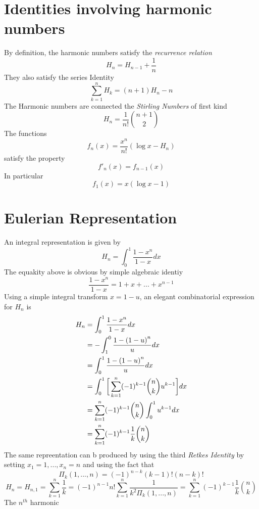 \documentclass{article}
\begin{document}
\section{Identities involving harmonic numbers}
By definition, the harmonic numbers satisfy the \emph{recurrence relation}
\begin{equation} 
H_{n}=H_{n-1}+\frac{1}{n} \label{recurrence relation}
\end{equation}
They also satisfy the series Identity
\begin{equation}
\sum_{k=1}^n H_{k} = (n+1) H_{n} - n \label{Series Identity}
\end{equation}
The Harmonic numbers are connected the \emph{Stirling Numbers} of first kind
\begin{equation}
H_{n} = \frac{1}{n!} {n+1 \choose 2} \label{Stirling Identity}
\end{equation}
The functions
\begin{equation}
f_{n} (x) = \frac{x^n}{n!} (\log{x}-H_{n})
\end{equation}
satisfy the property
\begin{equation}
{f'}_{n} (x) = f_{n-1} (x)
\end{equation}
In particular
\begin{equation}
f_{1} (x) = x(\log{x}-1)       			
\end{equation}
\section{Eulerian Representation}
An integral representation is given by
\begin{equation}
H_{n} = \int_{0}^{1} \frac{1-x^n}{1-x} dx \label{Euler equation}
\end{equation}
The equakity above is obvious by simple algebraic identiy
\begin{equation}
\frac{1-x^n}{1-x} = 1+x+...+x^{n-1}
\end{equation}
Using a simple integral transform ${x = 1-u}$, an elegant combinatorial expression for $H_{n}$ is
\begin{align}
H_{n} &= \int_{0}^{1} \frac{1-x^n}{1-x} dx \\
	 &= -\int_{1}^{0} \frac{1-{(1-u)}^n}{u} dx \\
	 &= \int_{0}^{1} \frac{1-{(1-u)}^n}{u} dx \\
	 &= \int_{0}^{1} \bigg{[}\sum_{k=1}^{n} (-1)^{k-1} {n \choose k} u^{k-1}\bigg{]}dx \\
	 &= \sum_{k=1}^{n} (-1)^{k-1} {n \choose k} \int_{0}^{1} u^{k-1} dx\\
	 &= \sum_{k=1}^{n} (-1)^{k-1} \frac{1}{k} {n \choose k}
\end{align}
The same repreentation can b produced by using the third \emph{Retkes Identity} by setting $x_{1} = 1, . . . , x_{n} = n$ and using the fact that
\begin{equation}
{\Pi}_{k}(1, . . . , n) = {(-1)}^{n-k} (k-1)!(n-k)!
\end{equation}
\begin{equation}
H_{n}=H_{n,1}=\sum_{k=1}^{n} \frac{1}{k} = {(-1)}^{n-1}n!\sum_{k=1}^{n}\frac{1}{k^{2}{\Pi}_{k}(1, . . . ,n)}=\sum_{k=1}^{n}{(-1)}^{k-1}\frac{1}{k}{n \choose k}
\end{equation}
The $n^{th}$ harmonic
\end{document}
